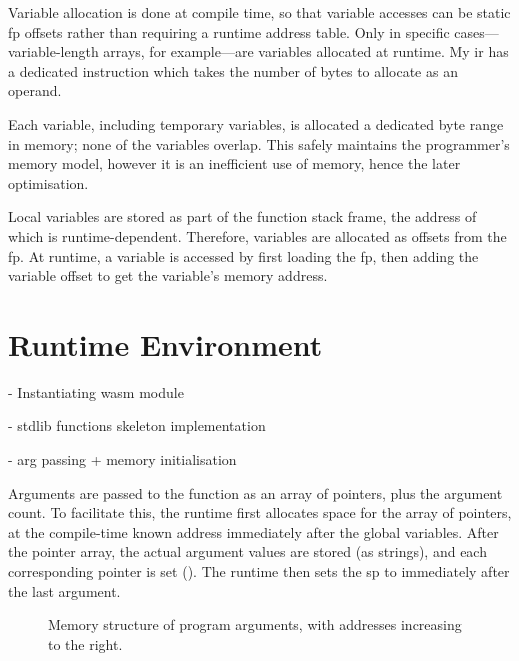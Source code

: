 \documentclass[00-main.tex]{subfiles}
\begin{document}
Variable allocation is done at compile time, so that variable accesses can be static \gls{fp} offsets rather than requiring a runtime address table.
Only in specific cases---variable-length arrays, for example---are variables allocated at runtime.
My \gls{ir} has a dedicated  instruction which takes the number of bytes to allocate as an operand.

Each variable, including temporary variables, is allocated a dedicated byte range in memory; none of the variables overlap.
This safely maintains the programmer's memory model, however it is an inefficient use of memory, hence the later optimisation.

Local variables are stored as part of the function stack frame, the address of which is runtime-dependent.
Therefore, variables are allocated as offsets from the \gls{fp}.
At runtime, a variable is accessed by first loading the \gls{fp}, then adding the variable offset to get the variable's memory address.

\section{Runtime Environment}
\label{sec:impl:runtime}

\begin{mrwComment}
- Instantiating wasm module

- stdlib functions skeleton implementation

- arg passing + memory initialisation
\end{mrwComment}

Arguments are passed to the  function as an array of  pointers, plus the argument count.
To facilitate this, the runtime first allocates space for the array of pointers, at the compile-time known address immediately after the global variables.
After the pointer array, the actual argument values are stored (as strings), and each corresponding pointer is set ().
The runtime then sets the \gls{sp} to immediately after the last argument.

\begin{figure}[ht]
  \centering
  \caption{Memory structure of program arguments, with addresses increasing to the right.}
  \label{fig:program args memory structure}
\end{figure}
\end{document}
